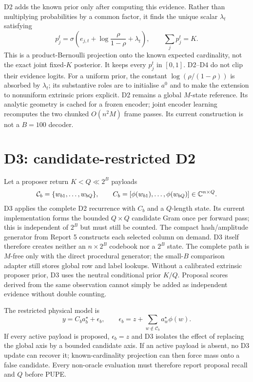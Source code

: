 \documentclass[11pt]{article}
\begin{document}
D2 adds the known prior only after computing this evidence. Rather than multiplying probabilities by a common factor,
it finds the unique scalar $\lambda_t$ satisfying
\[
 p_j^t=\sigma\!\left(e_{j,t}+\log\frac{\rho}{1-\rho}+\lambda_t\right),
 \qquad \sum_jp_j^t=K.
\]
This is a product-Bernoulli projection onto the known expected cardinality, not the exact joint fixed-$K$ posterior. It
keeps every $p_j^t$ in $[0,1]$.
D2--D4 do not clip their evidence logits. For a uniform prior, the constant $\log(\rho/(1-\rho))$ is absorbed by
$\lambda_t$; its substantive roles are to initialise $a^0$ and to make the extension to nonuniform extrinsic priors
explicit.
D2 remains a global $M$-state reference. Its analytic geometry is cached for a frozen encoder; joint encoder learning
recomputes the two chunked $O(n^2M)$ frame passes. Its current construction is not a $B=100$ decoder.

\section{D3: candidate-restricted D2}

Let a proposer return $K<Q\ll2^B$ payloads
\[
 \mathcal C_b=\{w_{b1},\ldots,w_{bQ}\},
 \qquad
 C_b=[\phi(w_{b1}),\ldots,\phi(w_{bQ})]\in\mathbb{C}^{n\times Q}.
\]
D3 applies the complete D2 recurrence with $C_b$ and a $Q$-length state. Its current implementation forms the bounded
$Q\times Q$ candidate Gram once per forward pass; this is independent of $2^B$ but must still be counted. The compact
hash/amplitude generator from Report 5 constructs each selected column on demand. D3 itself therefore creates neither
an $n\times2^B$ codebook nor a $2^B$ state. The complete path is $M$-free only with the direct procedural generator; the
small-$B$ comparison adapter still stores global row and label lookups. Without a calibrated extrinsic proposer prior,
D3 uses the neutral conditional prior $K/Q$. Proposal scores derived from the same observation cannot simply be added
as independent evidence without double counting.

The restricted physical model is
\[
 y=C_ba_b^\star+\epsilon_b,
 \qquad
 \epsilon_b=z+\sum_{w\notin\mathcal C_b}a_w^\star\phi(w).
\]
If every active payload is proposed, $\epsilon_b=z$ and D3 isolates the effect of replacing the global axis by a bounded
candidate axis. If an active payload is absent, no D3 update can recover it; known-cardinality projection can then force
mass onto a false candidate. Every non-oracle evaluation must therefore report proposal recall and $Q$ before PUPE.
\end{document}
